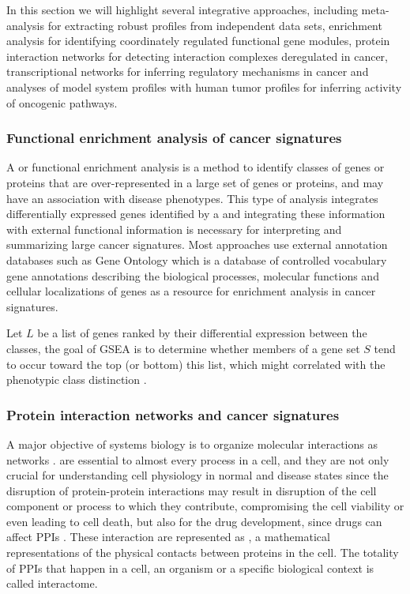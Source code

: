 In this section we will highlight several integrative  approaches, including meta-analysis for extracting robust profiles from independent data sets, enrichment analysis for identifying coordinately regulated functional gene modules, protein interaction networks for detecting interaction complexes deregulated in cancer, transcriptional networks for inferring regulatory mechanisms in cancer and analyses of model system profiles with human tumor profiles for inferring activity of oncogenic pathways.

\subsubsection{Functional enrichment analysis of cancer signatures}

A  or  functional enrichment analysis is a method to identify classes of genes or proteins that are over-represented in a large set of genes or proteins, and may have an association with disease phenotypes.
This type of analysis integrates  differentially expressed genes identified by a   and integrating these information with external functional information is necessary for interpreting and summarizing large cancer signatures.
Most approaches use external annotation databases such as Gene Ontology which is a database of controlled vocabulary gene annotations describing the biological processes, molecular functions and cellular localizations of genes as a resource for enrichment analysis in cancer signatures.

Let $L$ be a  list of genes ranked by their differential expression between the classes, the goal of GSEA is to determine whether members of a gene set $S$ tend to occur toward the top (or bottom) this list,  which might correlated with the phenotypic class
distinction \cite{subramanian2005gene}.

\subsubsection{Protein interaction networks and cancer signatures}

A major objective of systems biology is to organize molecular interactions as networks \cite{vinayagam2014integrating}.  are essential to almost every process in a cell, and they are not only crucial for understanding cell physiology in normal and disease states since the disruption of protein-protein interactions may result in disruption of the cell component or process to which they contribute, compromising the cell viability or even leading to cell death, but also for the drug development, since drugs can affect PPIs \cite{PPIs,alzate2009neuroproteomics}.
These interaction are represented as , a mathematical representations of the physical contacts between proteins in the cell.
The totality of PPIs that happen in a cell, an organism or a specific biological context is called interactome.

